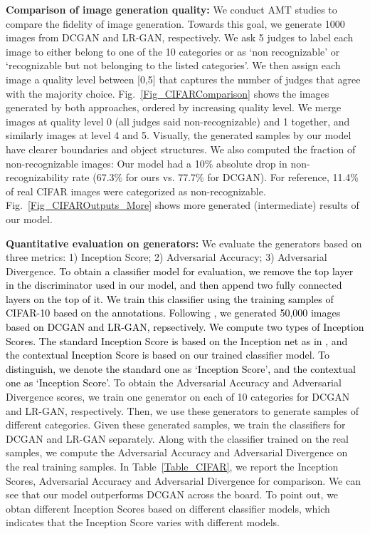 \documentclass{article} \usepackage{iclr2017_conference,times}
\begin{document}
{\bf Comparison of image generation quality:}   We conduct AMT studies to compare the fidelity of image generation.  Towards this goal, we generate 1000 images from DCGAN and LR-GAN, respectively.  We ask 5 judges to label each image to either belong to one of the 10 categories or as  `non recognizable' or `recognizable but not belonging to the listed categories'.  We then assign each image a quality level between [0,5]  that captures the number of judges that agree with the majority choice.  Fig.~\ref{Fig_CIFARComparison} shows the images generated by both  approaches, ordered by increasing quality level. We merge images at quality level 0 (all judges said non-recognizable) and 1 together, and similarly images at level 4 and 5.  Visually, the generated samples by our model have clearer boundaries and object structures.  We also computed the fraction of non-recognizable images: Our model had a 10\% absolute drop in non-recognizability rate (67.3\% for ours vs. 77.7\% for DCGAN). For reference, 11.4\% of real CIFAR images were categorized as non-recognizable. Fig.~\ref{Fig_CIFAROutputs_More} shows more generated (intermediate) results of our model.

{\bf Quantitative evaluation on generators:}  We evaluate the generators based on three metrics: 1) Inception Score; 2) Adversarial Accuracy; 3) Adversarial Divergence. \textcolor{black}{To obtain a classifier model for evaluation, we remove the top layer in the discriminator used in our model, and then append two fully connected layers on the top of it. We train this classifier using the training samples of CIFAR-10 based on the annotations. Following \cite{ImprovedGAN}, we generated 50,000 images based on DCGAN and LR-GAN, repsectively. We compute two types of Inception Scores. The standard Inception Score is based on the Inception net as in \cite{ImprovedGAN}, and the contextual Inception Score is based on our trained classifier model. To distinguish, we denote the standard one as `Inception Score\textsuperscript{\textdagger}', and the contextual one as `Inception Score\textsuperscript{\textdagger\textdagger}'.} To obtain the Adversarial Accuracy and Adversarial Divergence scores, we train one generator on each of 10 categories for DCGAN and LR-GAN, respectively. Then, we use these generators to generate samples of different categories. Given these generated samples, we train the classifiers for DCGAN and LR-GAN separately. Along with the classifier trained on the real samples, we compute the Adversarial Accuracy and Adversarial Divergence on the real training samples. In Table~\ref{Table_CIFAR}, we report the Inception Scores, Adversarial Accuracy and Adversarial Divergence for comparison.  We can see that our model outperforms DCGAN across the board. To point out, we obtan different Inception Scores based on different classifier models, which indicates that the Inception Score varies with different models.
\end{document}
